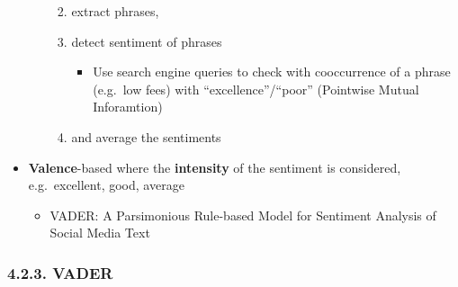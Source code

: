 \documentclass[11pt]{article}
\providecommand{\tightlist}{%
      \setlength{\itemsep}{0pt}\setlength{\parskip}{0pt}}
\begin{document}
\begin{itemize}
\begin{itemize}
    \begin{enumerate}
    \def\labelenumi{\arabic{enumi}.}
    \tightlist
    \item
      extract phrases,
    \item
      detect sentiment of phrases

      \begin{itemize}
      \tightlist
      \item
        Use search engine queries to check with cooccurrence of a phrase
        (e.g.~low fees) with ``excellence''/``poor'' (Pointwise Mutual
        Inforamtion)
      \end{itemize}
    \item
      and average the sentiments
    \end{enumerate}
  \end{itemize}
\item
  \textbf{Valence}-based where the \textbf{intensity} of the sentiment
  is considered, e.g.~excellent, good, average

  \begin{itemize}
  \tightlist
  \item
    VADER: A Parsimonious Rule-based Model for Sentiment Analysis of
    Social Media Text 
  \end{itemize}
\end{itemize}

    \hypertarget{vader}{%
\subsubsection{4.2.3. VADER}\label{vader}}
\end{document}
